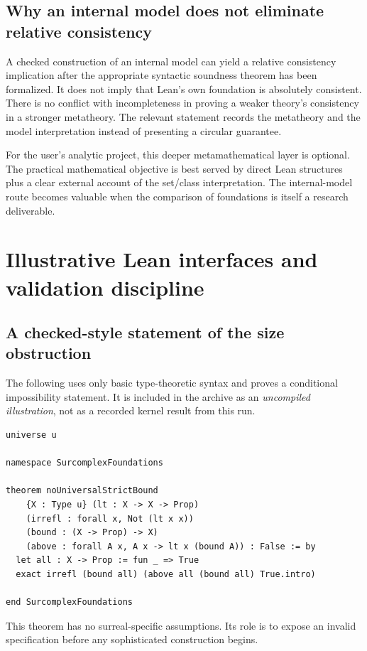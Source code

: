 \documentclass[11pt,letterpaper]{article}
\theoremstyle{definition}
\theoremstyle{remark}
\numberwithin{equation}{section}
\begin{document}
\subsection{Why an internal model does not eliminate relative consistency}
A checked construction of an internal model can yield a relative consistency implication after the appropriate syntactic soundness theorem has been formalized. It does not imply that Lean's own foundation is absolutely consistent. There is no conflict with incompleteness in proving a weaker theory's consistency in a stronger metatheory. The relevant statement records the metatheory and the model interpretation instead of presenting a circular guarantee.

For the user's analytic project, this deeper metamathematical layer is optional. The practical mathematical objective is best served by direct Lean structures plus a clear external account of the set/class interpretation. The internal-model route becomes valuable when the comparison of foundations is itself a research deliverable.

\section{Illustrative Lean interfaces and validation discipline}\label{sec:code}

\subsection{A checked-style statement of the size obstruction}
The following uses only basic type-theoretic syntax and proves a conditional impossibility statement. It is included in the archive as an \emph{uncompiled illustration}, not as a recorded kernel result from this run.
\begin{lstlisting}
universe u

namespace SurcomplexFoundations

theorem noUniversalStrictBound
    {X : Type u} (lt : X -> X -> Prop)
    (irrefl : forall x, Not (lt x x))
    (bound : (X -> Prop) -> X)
    (above : forall A x, A x -> lt x (bound A)) : False := by
  let all : X -> Prop := fun _ => True
  exact irrefl (bound all) (above all (bound all) True.intro)

end SurcomplexFoundations
\end{lstlisting}
This theorem has no surreal-specific assumptions. Its role is to expose an invalid specification before any sophisticated construction begins.
\end{document}
